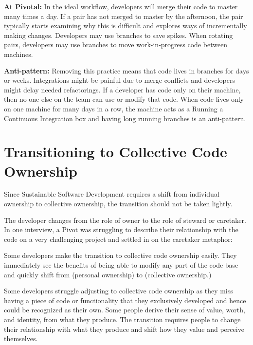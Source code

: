 \begin{table}[]
\textbf{At Pivotal:} In the ideal workflow, developers will merge their code to master many times a day. If a pair has not merged to master by the afternoon, the pair typically starts examining why this is difficult and explores ways of incrementally making changes. Developers may use branches to save spikes. When rotating pairs, developers may use branches to move work-in-progress code between machines.  

\textbf{Anti-pattern:} Removing this practice means that code lives in branches for days or weeks. Integrations might be painful due to merge conflicts and developers might delay needed refactorings. If a developer has code only on their machine, then no one else on the team can use or modify that code. When code lives only on one machine for many days in a row, the machine acts as a  Running a Continuous Integration box and having long running branches is an anti-pattern.
\section{Transitioning to Collective Code Ownership}
\label{Transitioning}
Since Sustainable Software Development requires a shift from individual ownership to collective ownership, the transition should not be taken lightly. 

The developer changes from the role of owner to the role of steward or caretaker. In one interview, a Pivot was struggling to describe their relationship with the code on a very challenging project and settled in on the caretaker metaphor: 

Some developers make the transition to collective code ownership easily. They immediately see the benefits of being able to modify any part of the code base and quickly shift from  (personal ownership) to  (collective ownership.)

Some developers struggle adjusting to collective code ownership as they miss having a piece of code or functionality that they exclusively developed and hence could be recognized as their own. Some people derive their sense of value, worth, and identity, from what they produce. The transition requires people to change their relationship with what they produce and shift how they value and perceive themselves. 


\end{table}
